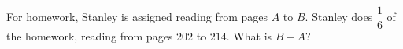 For homework, Stanley is assigned reading from pages $A$ to $B$. Stanley does $\dfrac{1}{6}$ of the homework, reading from pages $202$ to $214$. What is $B-A$?
